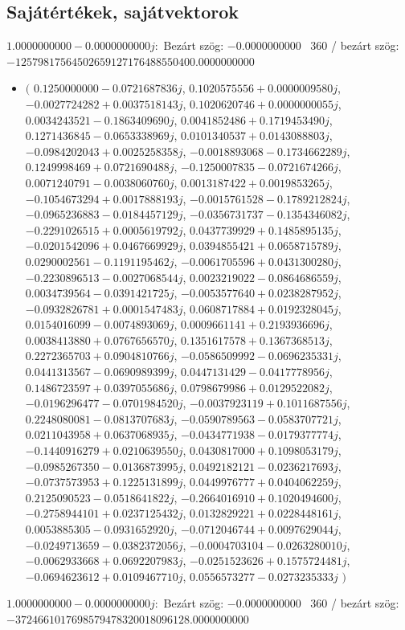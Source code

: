 \documentclass[14pt,a4paper]{article}
\begin{document}
\subsection{Sajátértékek, sajátvektorok}
$1.0000000000-0.0000000000j$:\
Bezárt szög: $-0.0000000000$ \
360 / bezárt szög: $-12579817564502659127176488550400.0000000000$\
\begin{itemize}
\item
$\big($
$0.1250000000-0.0721687836j$, $0.1020575556+0.0000009580j$, $-0.0027724282+0.0037518143j$, $0.1020620746+0.0000000055j$, $0.0034243521-0.1863409690j$, $0.0041852486+0.1719453490j$, $0.1271436845-0.0653338969j$, $0.0101340537+0.0143088803j$, $-0.0984202043+0.0025258358j$, $-0.0018893068-0.1734662289j$, $0.1249998469+0.0721690488j$, $-0.1250007835-0.0721674266j$, $0.0071240791-0.0038060760j$, $0.0013187422+0.0019853265j$, $-0.1054673294+0.0017888193j$, $-0.0015761528-0.1789212824j$, $-0.0965236883-0.0184457129j$, $-0.0356731737-0.1354346082j$, $-0.2291026515+0.0005619792j$, $0.0437739929+0.1485895135j$, $-0.0201542096+0.0467669929j$, $0.0394855421+0.0658715789j$, $0.0290002561-0.1191195462j$, $-0.0061705596+0.0431300280j$, $-0.2230896513-0.0027068544j$, $0.0023219022-0.0864686559j$, $0.0034739564-0.0391421725j$, $-0.0053577640+0.0238287952j$, $-0.0932826781+0.0001547483j$, $0.0608717884+0.0192328045j$, $0.0154016099-0.0074893069j$, $0.0009661141+0.2193936696j$, $0.0038413880+0.0767656570j$, $0.1351617578+0.1367368513j$, $0.2272365703+0.0904810766j$, $-0.0586509992-0.0696235331j$, $0.0441313567-0.0690989399j$, $0.0447131429-0.0417778956j$, $0.1486723597+0.0397055686j$, $0.0798679986+0.0129522082j$, $-0.0196296477-0.0701984520j$, $-0.0037923119+0.1011687556j$, $0.2248080081-0.0813707683j$, $-0.0590789563-0.0583707721j$, $0.0211043958+0.0637068935j$, $-0.0434771938-0.0179377774j$, $-0.1440916279+0.0210639550j$, $0.0430817000+0.1098053179j$, $-0.0985267350-0.0136873995j$, $0.0492182121-0.0236217693j$, $-0.0737573953+0.1225131899j$, $0.0449976777+0.0404062259j$, $0.2125090523-0.0518641822j$, $-0.2664016910+0.1020494600j$, $-0.2758944101+0.0237125432j$, $0.0132829221+0.0228448161j$, $0.0053885305-0.0931652920j$, $-0.0712046744+0.0097629044j$, $-0.0249713659-0.0382372056j$, $-0.0004703104-0.0263280010j$, $-0.0062933668+0.0692207983j$, $-0.0251523626+0.1575724481j$, $-0.0694623612+0.0109467710j$, $0.0556573277-0.0273235333j$
$\big)$
\end{itemize}
$1.0000000000-0.0000000000j$:\
Bezárt szög: $-0.0000000000$ \
360 / bezárt szög: $-3724661017698579478320018096128.0000000000$\
\end{document}
